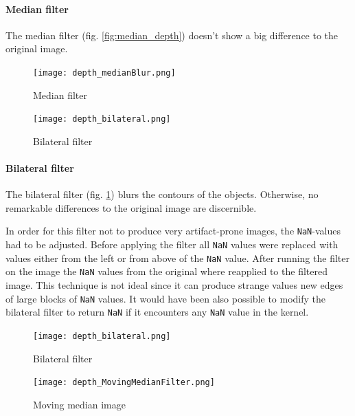 \documentclass[DIV12,a4paper]{scrartcl}
\begin{document}
\paragraph{Median filter}
The median filter (fig. \ref{fig:median_depth}) doesn't show a big difference to the original image.
\begin{figure}[h!tbp]
  \begin{minipage}{.5\textwidth}
  \centering
  \texttt{[image: depth\_medianBlur.png]}
  \caption{Median filter}
  \label{fig:median_depth}
\end{minipage}%
\begin{minipage}{.5\textwidth}
  \centering
  \texttt{[image: depth\_bilateral.png]}
  \caption{Bilateral filter}
  \label{fig:bilateral_depth}
\end{minipage}
\end{figure}

\paragraph{Bilateral filter}
The bilateral filter (fig. \ref{fig:bilateral_depth}) blurs the contours of the objects. Otherwise, no remarkable differences to the original image are discernible.\par
In order for this filter not to produce very artifact-prone images, the \texttt{NaN}-values had to be adjusted. Before applying the filter all \texttt{NaN} values were replaced with values either from the left or from above of the \texttt{NaN} value. After running the filter on the image the \texttt{NaN} values from the original where reapplied to the filtered image. This technique is not ideal since it can produce strange values new edges of large blocks of \texttt{NaN} values. It would have been also possible to modify the bilateral filter to return \texttt{NaN} if it encounters any \texttt{NaN} value in the kernel. %
\begin{figure}[h!tbp]
  \begin{minipage}{.5\textwidth}
    \centering
    \texttt{[image: depth\_bilateral.png]}
    \caption{Bilateral filter}
    \label{fig:bilateral_depth}
  \end{minipage}%
  \begin{minipage}{.5\textwidth}
    \centering
    \texttt{[image: depth\_MovingMedianFilter.png]}
    \caption{Moving median image}
    \label{fig:moving_median_depth}
  \end{minipage}
\end{figure}
\end{document}
